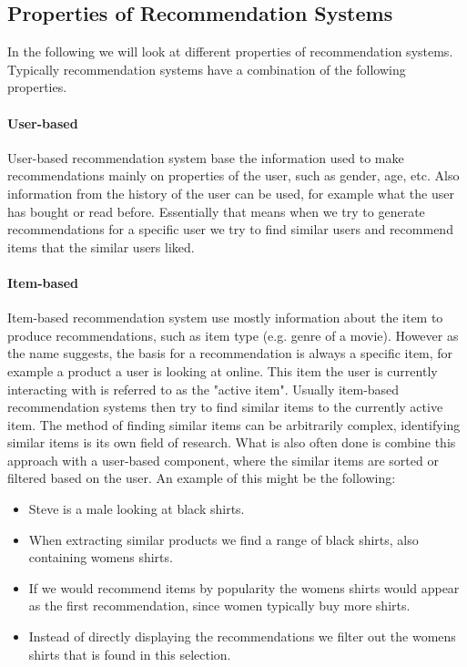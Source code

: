 \subsection{Properties of Recommendation Systems}
In the following we will look at different properties of recommendation systems.
Typically recommendation systems have a combination of the following properties.
\paragraph{User-based}
User-based recommendation system base the information used to make recommendations mainly on properties of the user, such as gender, age, etc.
Also information from the history of the user can be used, for example what the user has bought or read before.
Essentially that means when we try to generate recommendations for a specific user we try to find similar users and recommend items that the similar users liked. 
\paragraph{Item-based}
Item-based recommendation system use mostly information about the item to produce recommendations, such as item type (e.g. genre of a movie).
However as the name suggests, the basis for a recommendation is always a specific item, for example a product a user is looking at online.
This item the user is currently interacting with is referred to as the "active item". 
Usually item-based recommendation systems then try to find similar items to the currently active item. 
The method of finding similar items can be arbitrarily complex, identifying similar items is its own field of research.
What is also often done is combine this approach with a user-based component, where the similar items are sorted or filtered based on the user.
An example of this might be the following:
\begin{itemize}
    \item Steve is a male looking at black shirts.
    \item When extracting similar products we find a range of black shirts, also containing womens shirts.
    \item If we would recommend items by popularity the womens shirts would appear as the first recommendation, since women typically buy more shirts.
    \item Instead of directly displaying the recommendations we filter out the womens shirts that is found in this selection.
\end{itemize}
